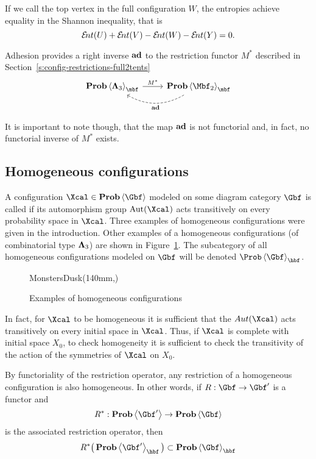   If we call the top vertex in the full configuration $W$, the
  entropies achieve equality in the Shannon inequality, that is
  \[
    \Ent( U ) + \Ent( V ) - \Ent( W ) - \Ent(Y) = 0.
  \]
 
  Adhesion provides a right inverse $\operatorname{\mathbf{ad}}$ to the restriction
  functor $M^{*}$ described in
  Section~\ref{s:config-restrictions-full2tents}
  \[
  \begin{tikzcd}[ampersand replacement=\&]
    \prob\<\Lambdabf_{3}>_{\mbf}
    \arrow{r}{M^{*}}
    \&
    \prob\<\Mbf_{2}>_{\mbf}
    \arrow[dashed,bend left]{l}{\ad}
  \end{tikzcd}
  \]

  It is important to note though, that the map $\operatorname{\mathbf{ad}}$ is not functorial
  and, in fact, no functorial inverse of $M^{*}$ exists.

\subsection{Homogeneous configurations}\label{s:config-homo}
  A configuration $\Xcal\in\prob\<\Gbf>$ modeled on some diagram
  category $\Gbf$ is called  if its automorphism group
  $\Aut(\Xcal)$ acts transitively on every probability space in
  $\Xcal$.  Three examples of homogeneous configurations were given in
  the introduction. Other examples of a homogeneous configurations (of
  combinatorial type $\bm\Lambda_{3}$) are shown in
  Figure~\ref{f:MonstersDusk}.  The
  subcategory of all homogeneous configurations modeled on $\Gbf$ will
  be denoted $\Prob\<\Gbf>_{\hbf}$.
  
  \begin{figure}
	\begin{lpic}{MonstersDusk(140mm,)}
	\end{lpic}
	\caption{Examples of homogeneous configurations}\label{f:MonstersDusk}
  \end{figure}

  In fact, for $\Xcal$ to be homogeneous it is sufficient that the
  $Aut(\Xcal)$ acts transitively on every initial space in $\Xcal$.
  Thus, if $\Xcal$ is complete with initial space $X_{0}$, to
  check homogeneity it is sufficient to check the transitivity of the
  action of the symmetries of $\Xcal$ on $X_{0}$.

  By functoriality of the restriction operator, any restriction of a
  homogeneous configuration is also homogeneous. In other words, if
  $R:\Gbf\to\Gbf'$ is a functor and
  \[
  R^{*}:\prob\<\Gbf'>\to\prob\<\Gbf>
  \] 
  is the associated restriction operator, then
  \[
  R^{*}\big(\prob\<\Gbf'>_{\hbf}\big)\subset\prob\<\Gbf>_{\hbf}
  \]

